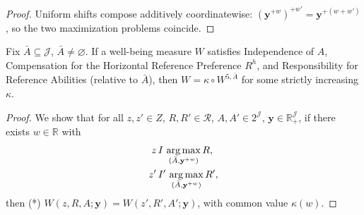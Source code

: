 \begin{proof}
Uniform shifts compose additively coordinatewise:
$(\mathbf y^{+w})^{+w'}=\mathbf y^{+(w+w')}$, so the two maximization problems
coincide.
\end{proof}

\begin{theorem}
\label{thm:w5gen}
Fix $\bar A\subseteq\mathcal J$, $\bar A\neq\varnothing$. If a well-being measure
$W$ satisfies Independence of $A$, Compensation for the Horizontal Reference
Preference $R^h$, and Responsibility for Reference Abilities (relative to
$\bar A$), then $W=\kappa\circ W^{5,\bar A}$ for some strictly increasing
$\kappa$.
\end{theorem}

\begin{proof}
We show that for all $z,z'\in Z$, $R,R'\in\mathcal R$, $A,A'\in 2^{\mathcal J}$,
$\mathbf y\in\mathbb R_+^{\mathcal J}$, if there exists $w\in\mathbb R$ with
\begin{align}
z\,&I\,\operatorname*{arg\,max}_{(\bar A,\mathbf y^{+w})}R, \label{th_5a_z}\\
z'\,&I'\,\operatorname*{arg\,max}_{(\bar A,\mathbf y^{+w})}R', \label{th_5a_zp}
\end{align}
then (*) $W(z,R,A;\mathbf y)=W(z',R',A';\mathbf y)$, with common value
$\kappa(w)$.


\end{proof}
